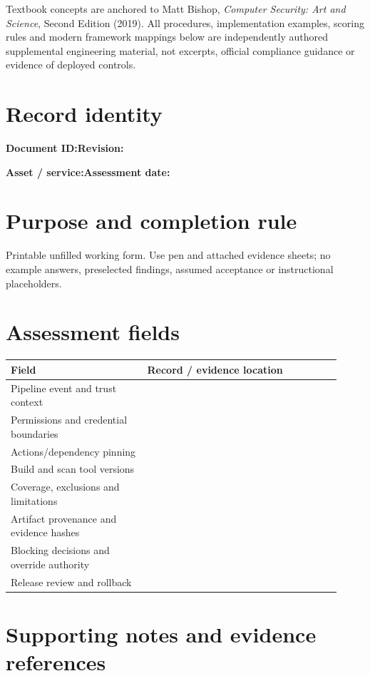 \documentclass[10pt,letterpaper]{article}
\begin{document}
\makedoctocpage
\begin{notebox}
Textbook concepts are anchored to Matt Bishop, \emph{Computer Security: Art and Science}, Second Edition (2019). All procedures, implementation examples, scoring rules and modern framework mappings below are independently authored supplemental engineering material, not excerpts, official compliance guidance or evidence of deployed controls.
\end{notebox}
\section{Record identity}
\textbf{Document ID:}\enspace\hrulefill\quad\textbf{Revision:}\enspace\hrulefill
\par\medskip\textbf{Asset / service:}\enspace\hrulefill\quad\textbf{Assessment date:}\enspace\hrulefill
\section{Purpose and completion rule}
Printable unfilled working form. Use pen and attached evidence sheets; no example answers, preselected findings, assumed acceptance or instructional placeholders.
\section{Assessment fields}
\renewcommand{\arraystretch}{1.8}
\begin{longtable}{@{}p{0.38\linewidth}p{0.54\linewidth}@{}}
\toprule\textbf{Field}&\textbf{Record / evidence location}\\\midrule\endhead
Pipeline event and trust context & \rule{0pt}{1.3cm}\\\midrule
Permissions and credential boundaries & \rule{0pt}{1.3cm}\\\midrule
Actions/dependency pinning & \rule{0pt}{1.3cm}\\\midrule
Build and scan tool versions & \rule{0pt}{1.3cm}\\\midrule
Coverage, exclusions and limitations & \rule{0pt}{1.3cm}\\\midrule
Artifact provenance and evidence hashes & \rule{0pt}{1.3cm}\\\midrule
Blocking decisions and override authority & \rule{0pt}{1.3cm}\\\midrule
Release review and rollback & \rule{0pt}{1.3cm}\\\midrule
\bottomrule\end{longtable}
\section{Supporting notes and evidence references}
\end{document}
